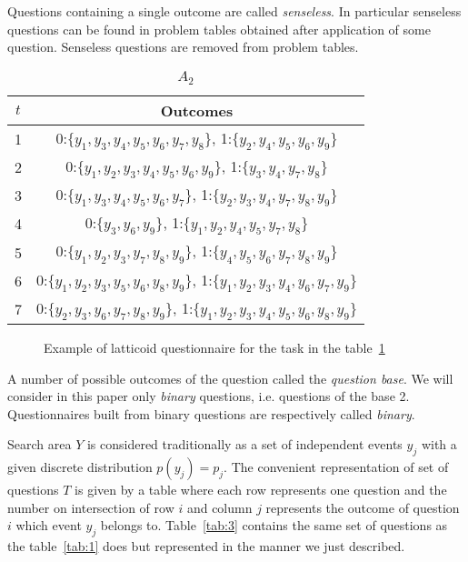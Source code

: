 \documentclass[11pt]{article}
\begin{document}
Questions containing a single outcome are called \emph{senseless}. In particular senseless questions can be found in problem tables obtained after application of some question. Senseless questions are removed from problem tables. 

\begin{table}[ht]
\begin{center}
\begin{tabular}{|c||c|} \hline
$t$ & \textsf{Outcomes} \\ \hline\hline
1 & 0:$\{y_1, y_3, y_4, y_5, y_6, y_7, y_8\}$, 1:$\{y_2, y_4, y_5, y_6, y_9\}$ \\ \hline
2 & 0:$\{y_1, y_2, y_3, y_4, y_5, y_6, y_9\}$, 1:$\{y_3, y_4, y_7, y_8\}$ \\ \hline
3 & 0:$\{y_1, y_3, y_4, y_5, y_6, y_7\}$, 1:$\{y_2, y_3, y_4, y_7, y_8, y_9\}$ \\ \hline
4 & 0:$\{y_3, y_6, y_9\}$, 1:$\{y_1, y_2, y_4, y_5, y_7, y_8\}$ \\ \hline
5 & 0:$\{y_1, y_2, y_3, y_7, y_8, y_9\}$, 1:$\{y_4, y_5, y_6, y_7, y_8, y_9\}$ \\ \hline
6 & 0:$\{y_1, y_2, y_3, y_5, y_6, y_8, y_9\}$, 1:$\{y_1, y_2, y_3, y_4, y_6, y_7, y_9\}$ \\ \hline
7 & 0:$\{y_2, y_3, y_6, y_7, y_8, y_9\}$, 1:$\{y_1, y_2, y_3, y_4, y_5, y_6, y_8, y_9\}$ \\ \hline
\end{tabular}
\end{center}
\caption{$A_2$\label{tab:2}}
\end{table}

\begin{figure*}[htbp]
\begin{center} 
\setlength{\unitlength}{0.254mm}

\caption{Example of latticoid questionnaire for the task in the table~\ref{tab:2}}
\label{fig:3_2}
\end{center} 
\end{figure*}

A number of possible outcomes of the question called the \emph{question base}. We will consider in this paper only \emph{binary} questions, i.e. questions of the base 2. Questionnaires built from binary questions are respectively called \emph{binary}.

Search area $Y$ is considered traditionally as a set of independent events $y_j$ with a given discrete distribution $p(y_j)=p_j$. The convenient representation of set of questions $T$ is given by a table where each row represents one question and the number on intersection of row $i$ and column $j$ represents the outcome of question $i$ which event $y_j$ belongs to. Table~\ref{tab:3} contains the same set of questions as the table~\ref{tab:1} does but represented in the manner we just described.
\end{document}
